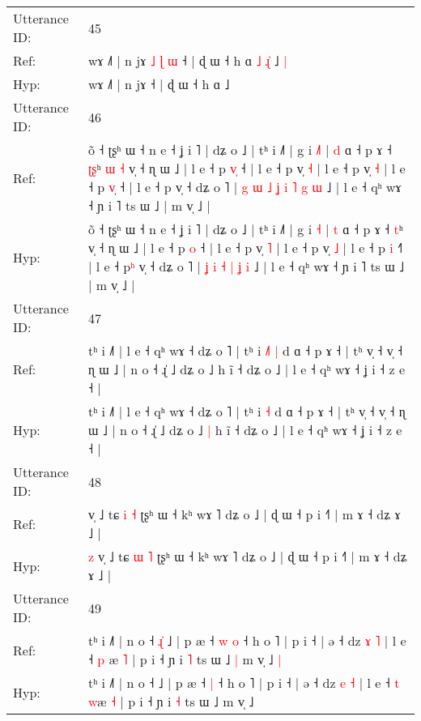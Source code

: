 \documentclass[10pt]{article}
\DeclareRobustCommand{\hl}[1]{{\textcolor{red}{#1}}}
\begin{document}
\begin{longtable}{ll}
 \\
\midrule
Utterance ID: & 45 \\
Ref: & wɤ ˩˥ | n jɤ\hl{ }\hl{˩}\hl{ }\hl{ɭ}\hl{ }\hl{ɯ} ˧ | ɖ ɯ ˧ h ɑ\hl{ }\hl{˩}\hl{ }\hl{ɻ}\hl{̍} ˩\hl{ }\hl{|}
 \\
Hyp: & wɤ ˩˥ | n jɤ\hl{}\hl{}\hl{}\hl{}\hl{}\hl{} ˧ | ɖ ɯ ˧ h ɑ\hl{}\hl{}\hl{}\hl{}\hl{} ˩\hl{}\hl{}
 \\
\midrule
Utterance ID: & 46 \\
Ref: & õ ˧ ʈʂʰ ɯ ˧ n e ˧ ʝ i ˥ | dʑ o ˩ | tʰ i ˩˥ | g i \hl{˩}\hl{˥} | \hl{d} ɑ ˧ p ɤ ˧ \hl{ʈ}\hl{ʂ}ʰ\hl{ }\hl{ɯ}\hl{ }\hl{˧} v̩ ˧ ɳ ɯ ˩ | l e ˧ p \hl{v}\hl{̩} ˧ | l e ˧ p v̩ \hl{˧} | l e ˧ p v̩ \hl{˧} | l e ˧ p \hl{v}\hl{̩} ˧\hl{} | l e ˧ p\hl{} v̩ ˧ dʑ o ˥ |\hl{ }\hl{g}\hl{ }\hl{ɯ} \hl{˩} \hl{ʝ} \hl{i} \hl{˥} \hl{g} \hl{ɯ} ˩ | l e ˧ qʰ wɤ ˧ ɲ i ˥ ts ɯ ˩ | m v̩ ˩ |
 \\
Hyp: & õ ˧ ʈʂʰ ɯ ˧ n e ˧ ʝ i ˥ | dʑ o ˩ | tʰ i ˩˥ | g i \hl{}\hl{˧} | \hl{t} ɑ ˧ p ɤ ˧ \hl{}\hl{t}ʰ\hl{}\hl{}\hl{}\hl{} v̩ ˧ ɳ ɯ ˩ | l e ˧ p \hl{}\hl{o} ˧ | l e ˧ p v̩ \hl{˥} | l e ˧ p v̩ \hl{˩} | l e ˧ p \hl{}\hl{i} ˧\hl{˥} | l e ˧ p\hl{ʰ} v̩ ˧ dʑ o ˥ |\hl{}\hl{}\hl{}\hl{} \hl{ʝ} \hl{i} \hl{˧} \hl{|} \hl{ʝ} \hl{i} ˩ | l e ˧ qʰ wɤ ˧ ɲ i ˥ ts ɯ ˩ | m v̩ ˩ |
 \\
\midrule
Utterance ID: & 47 \\
Ref: & tʰ i ˩˥ | l e ˧ qʰ wɤ ˧ dʑ o ˥ | tʰ i\hl{ }\hl{˩}\hl{˥} \hl{|} d ɑ ˧ p ɤ ˧ | tʰ v̩ ˧ v̩ ˧ ɳ ɯ ˩ | n o ˧ ɻ̍ ˩ dʑ o ˩\hl{}\hl{} h ĩ ˧ dʑ o ˩ | l e ˧ qʰ wɤ ˧ ʝ i ˧ z e ˧ |
 \\
Hyp: & tʰ i ˩˥ | l e ˧ qʰ wɤ ˧ dʑ o ˥ | tʰ i\hl{}\hl{}\hl{} \hl{˧} d ɑ ˧ p ɤ ˧ | tʰ v̩ ˧ v̩ ˧ ɳ ɯ ˩ | n o ˧ ɻ̍ ˩ dʑ o ˩\hl{ }\hl{|} h ĩ ˧ dʑ o ˩ | l e ˧ qʰ wɤ ˧ ʝ i ˧ z e ˧ |
 \\
\midrule
Utterance ID: & 48 \\
Ref: & \hl{}\hl{}v̩ ˩ tɕ \hl{i} \hl{˧} ʈʂʰ ɯ ˧ kʰ wɤ ˥ dʑ o ˩ | ɖ ɯ ˧ p i ˧˥ | m ɤ ˧ dʑ ɤ ˩ |
 \\
Hyp: & \hl{z}\hl{ }v̩ ˩ tɕ \hl{ɯ} \hl{˥} ʈʂʰ ɯ ˧ kʰ wɤ ˥ dʑ o ˩ | ɖ ɯ ˧ p i ˧˥ | m ɤ ˧ dʑ ɤ ˩ |
 \\
\midrule
Utterance ID: & 49 \\
Ref: & tʰ i ˩˥ | n o ˧\hl{ }\hl{ɻ}\hl{̍} ˩ | p æ ˧\hl{ }\hl{w} \hl{o} ˧ h o ˥ | p i ˧ | ə ˧ dz \hl{ɤ} \hl{˥} | l e ˧ \hl{p} \hl{}æ \hl{˥} | p i ˧ ɲ i \hl{˥} ts ɯ ˩\hl{ }\hl{|} m v̩ ˩\hl{ }\hl{|}
 \\
Hyp: & tʰ i ˩˥ | n o ˧\hl{}\hl{}\hl{} ˩ | p æ ˧\hl{}\hl{} \hl{|} ˧ h o ˥ | p i ˧ | ə ˧ dz \hl{e} \hl{˧} | l e ˧ \hl{t} \hl{w}æ \hl{˧} | p i ˧ ɲ i \hl{˧} ts ɯ ˩\hl{}\hl{} m v̩ ˩\hl{}\hl{}

\end{longtable}
\end{document}
